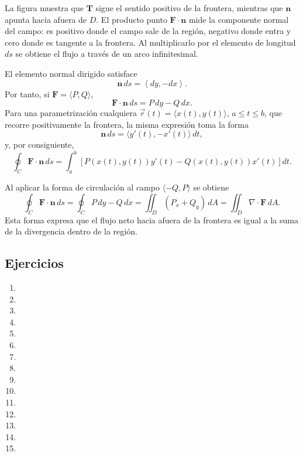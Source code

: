 La figura muestra que $\mathbf{T}$ sigue el sentido positivo de la frontera, mientras que $\mathbf{n}$ apunta hacia afuera de $D$. El producto punto $\mathbf{F}\cdot\mathbf{n}$ mide la componente normal del campo: es positivo donde el campo sale de la región, negativo donde entra y cero donde es tangente a la frontera. Al multiplicarlo por el elemento de longitud $ds$ se obtiene el flujo a través de un arco infinitesimal.

El elemento normal dirigido satisface
\[
\mathbf{n}\,ds
=\left\langle dy,-dx\right\rangle.
\]
Por tanto, si $\mathbf{F}=\langle P,Q\rangle$,
\[
\mathbf{F}\cdot\mathbf{n}\,ds=P\,dy-Q\,dx.
\]
Para una parametrización cualquiera $\vec r(t)=\langle x(t),y(t)\rangle$, $a\leq t\leq b$, que recorre positivamente la frontera, la misma expresión toma la forma
\[
\mathbf{n}\,ds=\langle y'(t),-x'(t)\rangle\,dt,
\]
y, por consiguiente,
\[
\oint_C\mathbf{F}\cdot\mathbf{n}\,ds
=\int_a^b\left[P(x(t),y(t))y'(t)
-Q(x(t),y(t))x'(t)\right]dt.
\]

Al aplicar la forma de circulación al campo $\langle-Q,P\rangle$ se obtiene
\[
\oint_C\mathbf{F}\cdot\mathbf{n}\,ds
=\oint_C P\,dy-Q\,dx
=\iint_D(P_x+Q_y)\,dA
=\iint_D\nabla\cdot\mathbf{F}\,dA.
\]
Esta forma expresa que el flujo neto hacia afuera de la frontera es igual a la suma de la divergencia dentro de la región.


\subsection{Ejercicios}
\begin{enumerate}
    \item 
    \item 
    \item 
    \item 
    \item 
    \item 
    \item 
    \item 
    \item 
    \item 
    \item 
    \item 
    \item 
    \item 
    \item 
\end{enumerate}
